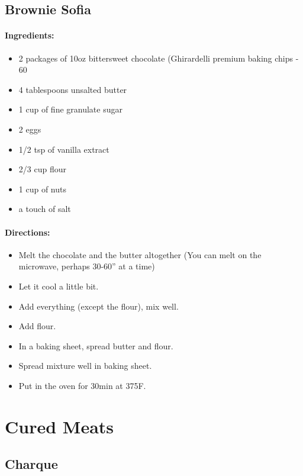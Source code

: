 \documentclass{article}
\begin{document}
\subsection{Brownie Sofia}

\paragraph{Ingredients:}

\begin{itemize}
	\item 2 packages of 10oz bittersweet chocolate (Ghirardelli premium baking chips - 60%
	\item 4 tablespoons unsalted butter
	\item 1 cup of fine granulate sugar
	\item 2 eggs
	\item 1/2 tsp of vanilla extract
	\item 2/3 cup flour
	\item 1 cup of nuts
	\item a touch of salt
\end{itemize}

\paragraph{Directions:}
\begin{itemize}
	\item Melt the chocolate and the butter altogether (You can melt on the microwave, perhaps 30-60'' at a time)
	\item Let it cool a little bit.
	\item Add everything (except the flour), mix well.
	\item Add flour.
	\item In a baking sheet, spread butter and flour.
	\item Spread mixture well in baking sheet.
	\item Put in the oven for 30min at 375F.
\end{itemize}

\section{Cured Meats}

\subsection{Charque}
\end{document}
